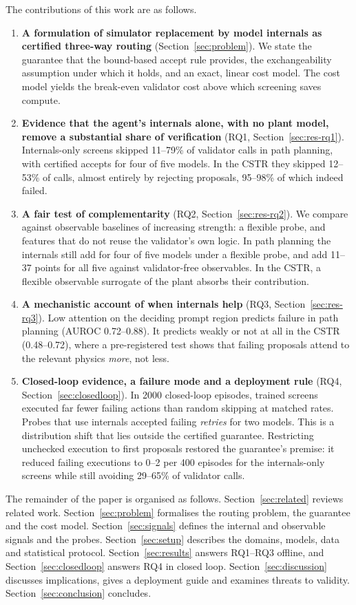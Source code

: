 The contributions of this work are as follows.
\begin{enumerate}
\item \textbf{A formulation of simulator replacement by model internals as certified three-way routing}
(Section~\ref{sec:problem}). We state the guarantee that the bound-based accept rule provides, the
exchangeability assumption under which it holds, and an exact, linear cost model. The cost model yields the
break-even validator cost above which screening saves compute.
\item \textbf{Evidence that the agent's internals alone, with no plant model, remove a substantial share of
verification} (RQ1, Section~\ref{sec:res-rq1}). Internals-only screens skipped 11--79\% of validator calls in
path planning, with certified accepts for four of five models. In the CSTR they skipped 12--53\% of calls,
almost entirely by rejecting proposals, 95--98\% of which indeed failed.
\item \textbf{A fair test of complementarity} (RQ2, Section~\ref{sec:res-rq2}). We compare against observable
baselines of increasing strength: a flexible probe, and features that do not reuse the validator's own logic. In
path planning the internals still add for four of five models under a flexible probe, and add 11--37 points for
all five against validator-free observables. In the CSTR, a flexible observable surrogate of the plant absorbs
their contribution.
\item \textbf{A mechanistic account of when internals help} (RQ3, Section~\ref{sec:res-rq3}). Low attention on
the deciding prompt region predicts failure in path planning (AUROC 0.72--0.88). It predicts weakly or not at
all in the CSTR (0.48--0.72), where a pre-registered test shows that failing proposals attend to the relevant
physics \emph{more}, not less.
\item \textbf{Closed-loop evidence, a failure mode and a deployment rule} (RQ4, Section~\ref{sec:closedloop}). In
2000 closed-loop episodes, trained screens executed far fewer failing actions than random skipping at matched
rates. Probes that use internals accepted failing \emph{retries} for two models. This is a distribution shift
that lies outside the certified guarantee. Restricting unchecked execution to first proposals restored the
guarantee's premise: it reduced failing executions to 0--2 per 400 episodes for the internals-only screens
while still avoiding 29--65\% of validator calls.
\end{enumerate}

The remainder of the paper is organised as follows. Section~\ref{sec:related} reviews related work.
Section~\ref{sec:problem} formalises the routing problem, the guarantee and the cost model.
Section~\ref{sec:signals} defines the internal and observable signals and the probes.
Section~\ref{sec:setup} describes the domains, models, data and statistical protocol.
Section~\ref{sec:results} answers RQ1--RQ3 offline, and Section~\ref{sec:closedloop} answers RQ4 in closed loop.
Section~\ref{sec:discussion} discusses implications, gives a deployment guide and examines threats to validity.
Section~\ref{sec:conclusion} concludes.
